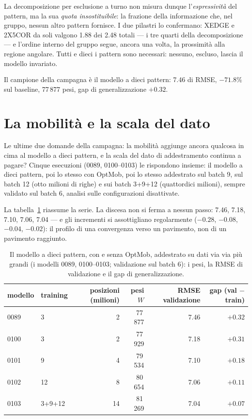 La decomposizione per esclusione a turno non misura dunque
l'\emph{espressività} del pattern, ma la sua \emph{quota
insostituibile}: la frazione della informazione che, nel gruppo,
nessun altro pattern fornisce. I due pilastri lo confermano:
XEDGE e 2X5COR da soli valgono 1.88 dei 2.48 totali — i tre
quarti della decomposizione — e l'ordine interno del gruppo
segue, ancora una volta, la prossimità alla regione angolare.
Tutti e dieci i pattern sono necessari: nessuno, escluso, lascia
il modello invariato.

Il campione della campagna è il modello a dieci pattern: 7.46 di
RMSE, $-71.8\%$ sul baseline, 77\,877 pesi, gap di
generalizzazione $+0.32$.

\section{La mobilità e la scala del dato}

Le ultime due domande della campagna: la mobilità aggiunge ancora
qualcosa in cima al modello a dieci pattern, e la scala del dato di
addestramento continua a pagare? Cinque esecuzioni (0089,
0100--0103) le rispondono insieme: il modello a dieci pattern, poi
lo stesso con OptMob, poi lo stesso addestrato sul batch 9, sul
batch 12 (otto milioni di righe) e sui batch 3+9+12 (quattordici
milioni), sempre validato sul batch 6, analisi sulle configurazioni
disattivate.

La tabella~\ref{tab:mobilita-scala-dato} riassume la serie. La
discesa non si ferma a nessun passo: 7.46, 7.18, 7.10, 7.06, 7.04 —
e gli incrementi si assottigliano regolarmente ($-0.28$, $-0.08$,
$-0.04$, $-0.02$): il profilo di una convergenza verso un
pavimento, non di un pavimento raggiunto.

\begin{table}[ht]
\centering
\begin{tabular}{llrrrr}
\toprule
modello & training & posizioni (milioni) & pesi $W$ & RMSE validazione & gap (val $-$ train) \\
\midrule
0089 & 3      & 2  & 77\,877 & 7.46 & $+0.32$ \\
0100 & 3      & 2  & 77\,929 & 7.18 & $+0.31$ \\
0101 & 9      & 4  & 79\,534 & 7.10 & $+0.18$ \\
0102 & 12     & 8  & 80\,654 & 7.06 & $+0.11$ \\
0103 & 3+9+12 & 14 & 81\,269 & 7.04 & $+0.07$ \\
\bottomrule
\end{tabular}
\caption{Il modello a dieci pattern, con e senza OptMob, addestrato
su dati via via più grandi (i modelli 0089, 0100--0103; validazione
sul batch 6): i pesi, la RMSE di validazione e il gap di
generalizzazione.}
\label{tab:mobilita-scala-dato}
\end{table}

